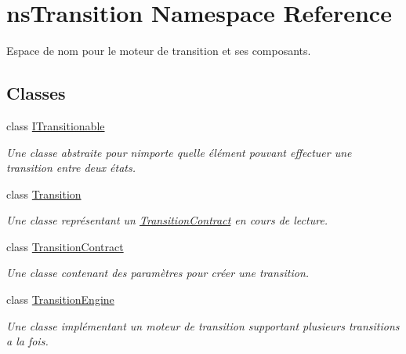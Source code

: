 \hypertarget{namespacens_transition}{}\section{ns\+Transition Namespace Reference}
\label{namespacens_transition}


Espace de nom pour le moteur de transition et ses composants.  


\subsection*{Classes}
\begin{DoxyCompactItemize}
\item 
class \hyperlink{classns_transition_1_1_i_transitionable}{I\+Transitionable}
\begin{DoxyCompactList}\small\item\em Une classe abstraite pour n\textquotesingle{}importe quelle élément pouvant effectuer une transition entre deux états. \end{DoxyCompactList}\item 
class \hyperlink{classns_transition_1_1_transition}{Transition}
\begin{DoxyCompactList}\small\item\em Une classe représentant un \hyperlink{classns_transition_1_1_transition_contract}{Transition\+Contract} en cours de lecture. \end{DoxyCompactList}\item 
class \hyperlink{classns_transition_1_1_transition_contract}{Transition\+Contract}
\begin{DoxyCompactList}\small\item\em Une classe contenant des paramètres pour créer une transition. \end{DoxyCompactList}\item 
class \hyperlink{classns_transition_1_1_transition_engine}{Transition\+Engine}
\begin{DoxyCompactList}\small\item\em Une classe implémentant un moteur de transition supportant plusieurs transitions a la fois. \end{DoxyCompactList}\end{DoxyCompactItemize}
